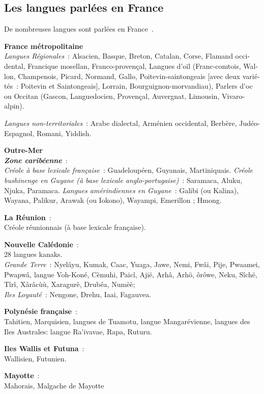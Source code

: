 \documentclass[]{../metanetpaper}
\begin{document}
\begin{french}
\begin{multicols}{2}
\subsection{Les langues parlées en France}
\label{languagesSpokenInTheFrance}
De nombreuses langues sont parlées en France~\cite{languesparleesfrance}.

{\bf France métropolitaine}\\
{\it Langues Régionales}~: Alsacien, Basque, Breton, Catalan, Corse, Flamand occidental, Francique mosellan, Franco-provençal, Langues d{\mbox '}oïl (Franc-comtois, Wallon, Champenois, Picard, Normand, Gallo, Poitevin-saintongeais [avec deux variétés~: Poitevin et Saintongeais], Lorrain, Bourguignon-morvandiau), Parlers d{\mbox '}oc ou Occitan (Gascon, Languedocien, Provençal, Auvergnat, Limousin, Vivaro-alpin).

{\it Langues non-territoriales}~: Arabe dialectal, Arménien occidental, Berbère, Judéo-Espagnol, Romani, Yiddish.

{\bf Outre-Mer}\\
\textbf{ \emph{Zone caribéenne}}~:\\
{\it Créole à base lexicale française}~: Guadeloupéen, Guyanais, Martiniquais.
{\it Créole bushinenge en Guyane (à base lexicale anglo-portugaise)}~: Saramaca, Aluku, Njuka, Paramaca.
{\it Langues amérindiennes en Guyane}~: Galibi (ou Kalina), Wayana, Palikur, Arawak (ou Iokono), Wayampi, Emerillon ; Hmong.

{\bf La Réunion}~:\\
Créole réunionnais (à base lexicale française).

{\bf Nouvelle Calédonie}~:\\
28 langues kanaks.\\
{\it Grande Terre}~: Nyelâyu, Kumak, Caac, Yuaga, Jawe, Nemi, Fwâi, Pije, Pwaamei, Pwapwâ, langue Voh-Koné, Cèmuhi, Paicî, Ajië, Arhâ, Arhö, ôrôwe, Neku, Sîchë, Tîrî, Xârâcùù, Xaragurè, Drubéa, Numèè; \\
{\it Iles Loyauté}~: Nengone, Drehu, Iaai, Fagauvea.

{\bf Polynésie française}~:\\
Tahitien, Marquisien, langues de Tuamotu, langue Mangarévienne, langues des Iles Australes: langue Ra{\mbox '}ivavae, Rapa, Ruturu.

{\bf Iles Wallis et Futuna}~:\\
Wallisien, Futunien.

{\bf Mayotte}~:\\
Mahorais, Malgache de Mayotte


\end{multicols}
\end{french}
\end{document}
